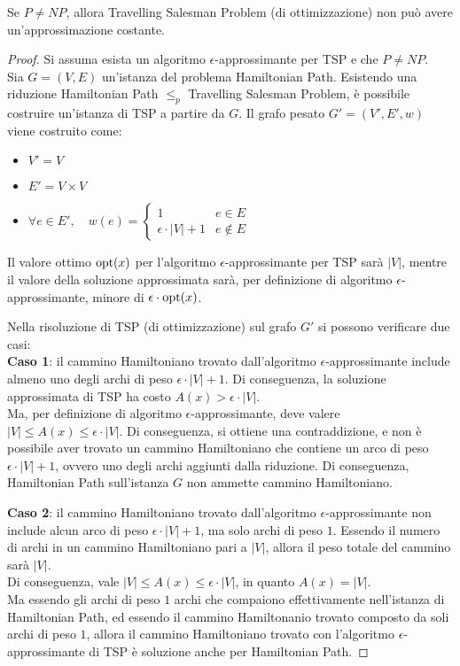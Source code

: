\begin{thm}
    Se $P \neq NP$, allora Travelling Salesman Problem (di ottimizzazione) non può avere un'approssimazione costante.
\end{thm}

\begin{proof}
    Si assuma esista un algoritmo $\epsilon$-approssimante per TSP e che $P \neq NP$.\\
    Sia $G = (V, E)$ un'istanza del problema Hamiltonian Path. Esistendo una riduzione Hamiltonian Path $\le_p$ Travelling Salesman Problem, è possibile costruire un'istanza di TSP a partire da $G$.
    Il grafo pesato $G' = (V', E', w)$ viene costruito come:
    \begin{itemize}
        \item $V' = V$
        \item $E' = V \times V$
        \item $\forall e \in E', \quad w(e) = \begin{cases}
            1 & e \in E\\
            \epsilon \cdot |V| + 1 & e \notin E
        \end{cases}$
    \end{itemize}
    Il valore ottimo $\textnormal{opt}(x)$ per l'algoritmo $\epsilon$-approssimante per TSP sarà $|V|$, mentre il valore della soluzione approssimata sarà, per definizione di algoritmo $\epsilon$-approssimante, minore di $\epsilon \cdot \textnormal{opt}(x)$.
    
    Nella risoluzione di TSP (di ottimizzazione) sul grafo $G'$ si possono verificare due casi:\\
    \textbf{Caso 1}: il cammino Hamiltoniano trovato dall'algoritmo $\epsilon$-approssimante include almeno uno degli archi di peso $\epsilon \cdot |V| + 1$. Di conseguenza, la soluzione approssimata di TSP ha costo $A(x) > \epsilon \cdot |V|$.\\
    Ma, per definizione di algoritmo $\epsilon$-approssimante, deve valere $|V| \le A(x) \le \epsilon \cdot |V|$. Di conseguenza, si ottiene una contraddizione, e non è possibile aver trovato un cammino Hamiltoniano che contiene un arco di peso $\epsilon \cdot |V| + 1$, ovvero uno degli archi aggiunti dalla riduzione.
    Di conseguenza, Hamiltonian Path sull'istanza $G$ non ammette cammino Hamiltoniano.
    
    \textbf{Caso 2}: il cammino Hamiltoniano trovato dall'algoritmo $\epsilon$-approssimante non include alcun arco di peso $\epsilon \cdot |V| + 1$, ma solo archi di peso $1$. Essendo il numero di archi in un cammino Hamiltoniano pari a $|V|$, allora il peso totale del cammino sarà $|V|$.\\
    Di conseguenza, vale $|V| \le A(x) \le \epsilon \cdot |V|$, in quanto $A(x) = |V|$.\\
    Ma essendo gli archi di peso $1$ archi che compaiono effettivamente nell'istanza di Hamiltonian Path, ed essendo il cammino Hamiltonanio trovato composto da soli archi di peso $1$, allora il cammino Hamiltoniano trovato con l'algoritmo $\epsilon$-approssimante di TSP è soluzione anche per Hamiltonian Path.


\end{proof}
